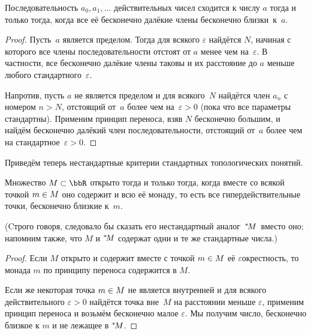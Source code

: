 \begin{theorem}
Последовательность $a_0,a_1,\dots$ действительных чисел сходится%
%
к числу $a$ тогда и только тогда, когда все её бесконечно далёкие
члены бесконечно близки~к~$a$.
\end{theorem}

\begin{proof}
Пусть~$a$ является пределом. Тогда для всякого $\varepsilon$
найдётся $N$, начиная с которого все члены последовательности
отстоят от $a$ менее чем на~$\varepsilon$. В частности, все
бесконечно далёкие члены таковы и их расстояние до $a$ меньше
любого стандартного~$\varepsilon$.

Напротив, пусть $a$ не является пределом и для всякого~$N$
найдётся член $a_n$ с номером $n>N$, отстоящий от~$a$ более
чем на~$\varepsilon>0$ (пока что все параметры стандартны).
Применим принцип переноса, взяв $N$ бесконечно большим,
и найдём бесконечно далёкий член последовательности,
отстоящий от~$a$ более чем на стандартное~$\varepsilon>0$.
\end{proof}

Приведём теперь нестандартные критерии стандартных
топологических понятий.

\begin{theorem}
Множество $M\hm\subset\bbR$ открыто%
%
тогда и только тогда,
когда вместе со всякой точкой $m\hm\in M$ оно содержит
и всю её монаду, то есть все гипердействительные точки,
бесконечно близкие к~$m$.
\end{theorem}

(Cтрого говоря, следовало бы сказать  его
нестандартный аналог~${}^*\!M$\ вместо  оно;
напомним также, что $M$ и ${}^*\!M$ содержат одни и те же
стандартные числа.)

\begin{proof}
Если $M$ открыто и содержит вместе с точкой $m\hm\in M$ её
$\varepsilon$\д ок\-рест\-ность, то монада  $m$ по принципу
переноса содержится в $M$.

Если же некоторая точка $m\hm\in M$ не является
внутренней и для всякого действительного $\varepsilon>0$
найдётся точка вне~$M$ на расстоянии меньше $\varepsilon$,
применим принцип переноса и возьмём бесконечно малое
$\varepsilon$. Мы получим число, бесконечно близкое к
$m$ и не лежащее в ${}^*\!M$.
\end{proof}

